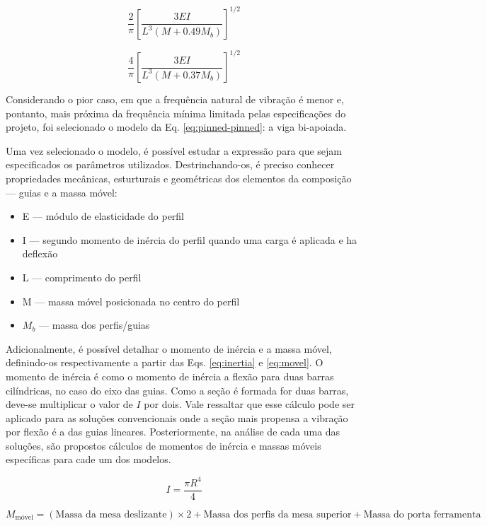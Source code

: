 \begin{equation}
\frac{2}{\pi}\left[\frac{3EI}{L^3 (M+0.49M_b)}\right]^{1/2}
\label{eq:pinned-pinned}
\end{equation}

\begin{equation}
\frac{4}{\pi}\left[\frac{3EI}{L^3 (M+0.37M_b)}\right]^{1/2}
\label{eq:clamped-clamped}
\end{equation}

Considerando o pior caso, em que a frequência natural de vibração é menor e, pontanto, mais próxima da frequência mínima limitada pelas especificações do projeto, foi selecionado o modelo da Eq. \ref{eq:pinned-pinned}: a viga bi-apoiada. 

Uma vez selecionado o modelo, é possível estudar a expressão para que sejam especificados os parâmetros utilizados. Destrinchando-os, é preciso conhecer propriedades mecânicas, esturturais e geométricas dos elementos da composição --- guias e a massa móvel:
\begin{itemize}
    \item  E --- módulo de elasticidade do perfil 
    \item I --- segundo momento de inércia do perfil quando uma carga é aplicada e ha deflexão
    \item L --- comprimento do perfil 
    \item M --- massa móvel posicionada no centro do perfil
    \item $M_b$ --- massa dos perfis/guias
\end{itemize}

Adicionalmente, é possível detalhar o momento de inércia  e a massa móvel, definindo-os respectivamente a partir das Eqs. \ref{eq:inertia} e \ref{eq:movel}. O momento de inércia é como o momento de inércia a flexão para duas barras cilíndricas, no caso do eixo das guias. Como a seção é formada for duas barras, deve-se multiplicar o valor de $I$ por dois. Vale ressaltar que esse cálculo pode ser aplicado para as soluções convencionais onde a seção mais propensa a vibração por flexão é a das guias lineares. Posteriormente, na análise de cada uma das soluções, são propostos cálculos de momentos de inércia e massas móveis específicas para cade um dos modelos.  

\begin{equation}
 I = \frac{\pi R^4}{4} 
\label{eq:inertia}
\end{equation}


\begin{dmath}
    M_{\text{móvel}} = (\text{Massa da mesa deslizante})\times 2 + \text{Massa dos perfis da mesa superior} + \text{Massa do porta ferramenta}
\label{eq:movel}
\end{dmath}


